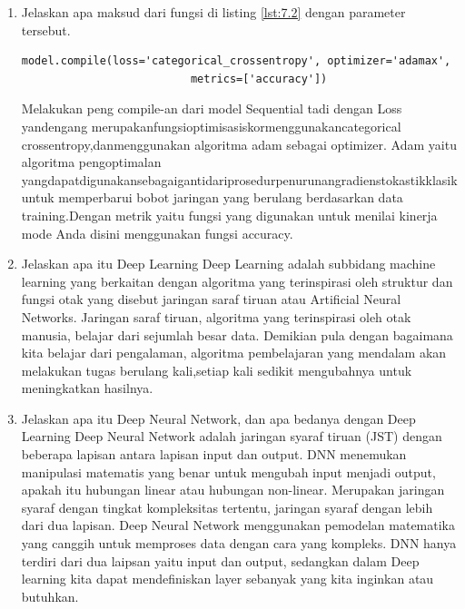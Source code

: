 \begin{enumerate}
	\item Jelaskan apa maksud dari fungsi di listing \ref{lst:7.2} dengan parameter tersebut.
	\hfill \break
	\begin{lstlisting}[caption=Compile model,label={lst:7.2}]
		model.compile(loss='categorical_crossentropy', optimizer='adamax',
						  metrics=['accuracy'])
	\end{lstlisting}
	Melakukan peng compile-an dari model Sequential tadi dengan Loss yandengang merupakanfungsioptimisasiskormenggunakancategorical crossentropy,danmenggunakan algoritma adam sebagai optimizer. Adam yaitu algoritma pengoptimalan yangdapatdigunakansebagaigantidariprosedurpenurunangradienstokastikklasik untuk memperbarui bobot jaringan yang berulang berdasarkan data training.Dengan metrik yaitu fungsi yang digunakan untuk menilai kinerja mode Anda disini menggunakan fungsi accuracy. 
	
	\item Jelaskan apa itu Deep Learning
	\hfill \break
	Deep Learning adalah subbidang machine learning yang berkaitan dengan algoritma yang terinspirasi oleh struktur dan fungsi otak yang disebut jaringan saraf tiruan atau Artiﬁcial Neural Networks. Jaringan saraf tiruan, algoritma yang terinspirasi oleh otak manusia, belajar dari sejumlah besar data. Demikian pula dengan bagaimana kita belajar dari pengalaman, algoritma pembelajaran yang mendalam akan melakukan tugas berulang kali,setiap kali sedikit mengubahnya untuk meningkatkan hasilnya.
	 
	\item Jelaskan apa itu Deep Neural Network, dan apa bedanya dengan Deep Learning
	\hfill \break
	Deep Neural Network adalah jaringan syaraf tiruan (JST) dengan beberapa lapisan antara lapisan input dan output. DNN menemukan manipulasi matematis yang benar untuk mengubah input menjadi output, apakah itu hubungan linear atau hubungan non-linear. Merupakan jaringan syaraf dengan tingkat kompleksitas tertentu, jaringan syaraf dengan lebih dari dua lapisan. Deep Neural Network menggunakan pemodelan matematika yang canggih untuk memproses data dengan cara yang kompleks. 
   \hfill \break	
	DNN hanya terdiri dari dua laipsan yaitu input dan output, sedangkan dalam Deep learning kita dapat mendeﬁniskan layer sebanyak yang kita inginkan atau butuhkan.
	

\end{enumerate}
